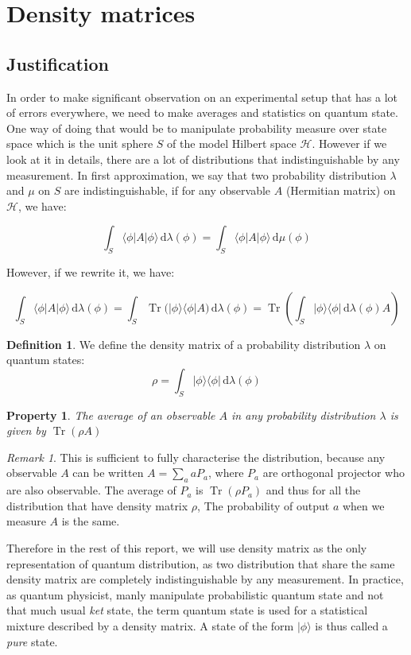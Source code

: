 \documentclass[10pt,a4paper]{report}
\theoremstyle{plain}
\newtheorem{prop}[thm]{Property}
\theoremstyle{definition}
\newtheorem{defn}{Definition}[chapter]
\theoremstyle{remark}
\newtheorem*{rem}{Remark}
\newcommand{\ket}[1]{|#1\rangle}
\newcommand{\bra}[1]{\langle#1|}
\newcommand{\dd}{\mathrm{d}}
\DeclareMathOperator{\Tr}{Tr}
\begin{document}
\section{Density matrices}

\subsection{Justification}

In order to make significant observation on an experimental setup that has a lot
of errors everywhere, we need to make averages and statistics on quantum state.
One way of doing that would be to manipulate probability measure over state
space which is the unit sphere $S$ of the model Hilbert space $\mathcal{H}$. However if we look at
it in details, there are a lot of distributions that indistinguishable by any
measurement. In first approximation, we say that two probability distribution
$\lambda$ and $\mu$ on $S$ are indistinguishable,
if for any observable $A$ (Hermitian matrix) on $\mathcal{H}$, we
have:

\[\int_S \bra \phi A \ket \phi\,\dd \lambda(\phi) = \int_S \bra \phi A \ket
  \phi\,\dd \mu(\phi) \]

However, if we rewrite it, we have:

\[\int_S \bra \phi A \ket \phi\,\dd \lambda(\phi)
  = \int_S \Tr\big(\ket \phi \bra \phi A\big) \,\dd \lambda(\phi)
  = \Tr\left(\int_S \ket \phi \bra \phi \,\dd \lambda(\phi) A \right)\]

\begin{defn} We define the density matrix of a probability distribution $\lambda$ on
  quantum states:
  \[ \rho = \int_S \ket \phi \bra \phi \,\dd\lambda(\phi) \]
\end{defn}
\begin{prop}
  The average of an observable $A$ in any probability distribution $\lambda$ is
  given by $\Tr(\rho A)$
\end{prop}

\begin{rem} This is sufficient to fully characterise the distribution, because
 any observable $A$ can be written $A = \sum_a aP_a$, where $P_a$ are orthogonal
 projector who are also observable. The average of $P_a$ is $\Tr(\rho P_a)$ and
 thus for all the distribution that have density matrix $\rho$, The probability
 of output $a$ when we measure $A$ is the same.
\end{rem}

Therefore in the rest of this report, we will use density matrix as the only
representation of quantum distribution, as two distribution that share the same
density matrix are completely indistinguishable by any measurement. In practice,
as quantum physicist, manly manipulate probabilistic quantum state and not that
much usual \emph{ket} state, the term quantum state is used for a statistical
mixture described by a density matrix. A state of the form $\ket \phi$ is thus
called a \emph{pure} state.
\end{document}
